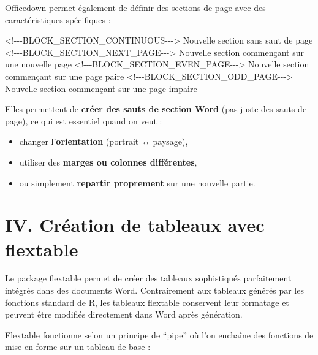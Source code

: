 \documentclass[
]{article}
\newenvironment{Shaded}{\begin{snugshade}}{\end{snugshade}}
\newcommand{\NormalTok}[1]{#1}
\begin{document}
Officedown permet également de définir des sections de page avec des
caractéristiques spécifiques :

\begin{Shaded}
\begin{Highlighting}[]
\NormalTok{\textless{}!{-}{-}{-}BLOCK\_SECTION\_CONTINUOUS{-}{-}{-}\textgreater{}}
\NormalTok{Nouvelle section sans saut de page}
\NormalTok{\textless{}!{-}{-}{-}BLOCK\_SECTION\_NEXT\_PAGE{-}{-}{-}\textgreater{}}
\NormalTok{Nouvelle section commençant sur une nouvelle page}
\NormalTok{\textless{}!{-}{-}{-}BLOCK\_SECTION\_EVEN\_PAGE{-}{-}{-}\textgreater{}}
\NormalTok{Nouvelle section commençant sur une page paire}
\NormalTok{\textless{}!{-}{-}{-}BLOCK\_SECTION\_ODD\_PAGE{-}{-}{-}\textgreater{}}
\NormalTok{Nouvelle section commençant sur une page impaire}
\end{Highlighting}
\end{Shaded}

Elles permettent de \textbf{créer des sauts de section Word} (pas juste
des sauts de page), ce qui est essentiel quand on veut :

\begin{itemize}
\item
  changer l'\textbf{orientation} (portrait ↔ paysage),
\item
  utiliser des \textbf{marges ou colonnes différentes},
\item
  ou simplement \textbf{repartir proprement} sur une nouvelle partie.
\end{itemize}

\section{IV. Création de tableaux avec
flextable}\label{iv.-cruxe9ation-de-tableaux-avec-flextable}

Le package flextable permet de créer des tableaux sophistiqués
parfaitement intégrés dans des documents Word. Contrairement aux
tableaux générés par les fonctions standard de R, les tableaux flextable
conservent leur formatage et peuvent être modifiés directement dans Word
après génération.

Flextable fonctionne selon un principe de ``pipe'' où l'on enchaîne des
fonctions de mise en forme sur un tableau de base :
\end{document}

